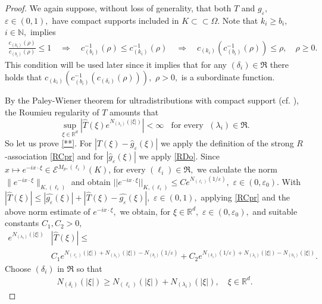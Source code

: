 \documentclass[sn-mathphys,Numbered]{sn-jnl}%
\theoremstyle{thmstyleone}%
\theoremstyle{thmstyletwo}%
\theoremstyle{thmstylethree}%
\begin{document}
\begin{proof}
We again suppose, without loss of generality, that both $T$ and $g_\varepsilon,$ $\varepsilon\in (0,1),$ have compact supports included in $ K\subset\subset\Omega.$  
Note that $k_i\geq b_i,$ $i\in \mathbb{N},$ implies 
\begin{align}\label{afo}
\frac{c_{(k_i)}(\rho)}{c_{(b_i)}(\rho)}\leq 1\quad\Rightarrow\quad c^{-1}_{(b_i)}(\rho)\leq c^{-1}_{(k_i)}(\rho)\quad\Rightarrow\quad c_{(k_i)}(c^{-1}_{(b_i)}(\rho))\leq \rho,\quad\rho\geq 0.
\end{align} 
This condition will be used later since it implies that for any $(\delta_i)\in\mathfrak{R}$ there holds that $c_{(k_i)}(c^{-1}_{(b_i)}(c_{(\delta_i)}(\rho))),$ $\rho>0,$ is a subordinate function.

By the  Paley-Wiener theorem  for ultradistributions with compact support (cf. \cite{Komatsu1}), the Roumieu regularity of $T$ amounts that  
\begin{equation}\label{**}
\sup_{\xi\in\mathbb R^d}\left| \hat{T}(\xi) e^{N_{(\lambda_i)}(|\xi|)}\right| <\infty\;\;\text{ for every }\;(\lambda_i)\in\mathfrak R.
\end{equation}
So let us prove \eqref{**}.  For $|T(\xi)-\hat g_\varepsilon(\xi)|$ we apply the definition of the strong $R$-association  \eqref{RCpr} and for $|\hat g_\varepsilon(\xi)|$ we apply \eqref{RDo}.  Since $x\mapsto e^{-ix\cdot \xi}\in\mathcal E^{M_p,(\ell_i)}(K)$, for every $(\ell_i)\in\mathfrak R,$ we calculate  the norm $\|e^{-ix\cdot\xi}\|_{K,(\ell_i)}$ and obtain $||e^{-ix\cdot \xi}||_{K,(\ell_i)}\leq Ce^{N_{(\ell_i)}(1/\varepsilon)},$ $\varepsilon\in(0,\varepsilon_0).$ With $|\hat{T}(\xi)| \leq  |\hat{g_{\varepsilon}}(\xi)|+|\hat{T}(\xi)- \hat{g_{\varepsilon}}(\xi)|,$ $\varepsilon\in (0,1),$ applying \eqref{RCpr} and the above norm estimate of $e^{-ix\cdot\xi},$ we obtain, for $\xi\in\mathbb R^d,$ $\varepsilon\in(0,\varepsilon_0),$ and suitable constants $C_1,C_2>0,$%
\begin{align}\label{final} 
e^{N_{(\lambda_i)}(|\xi|)}&\left|\hat{T}(\xi)\right| \leq\nonumber\\
& C_1 e^{N_{(\ell_i)}(|\xi|)+N_{(\lambda_i)}(|\xi|)-N_{(b_i)}(1/\varepsilon)} + C_2 e^{N_{(k_i)}(1/\varepsilon)+N_{(\lambda_i)}(|\xi|)-N_{(h_i)}(|\xi|)}.
\end{align} 
Choose $(\delta_i)$ in $\mathfrak R$ so that
\begin{align*}
N_{(\delta_i)}(|\xi|)\geq N_{(\ell_i)}(|\xi|)+N_{(\lambda_i)}(|\xi|), \quad \xi\in\mathbb R^d.

\end{align*}
\end{proof}
\end{document}

